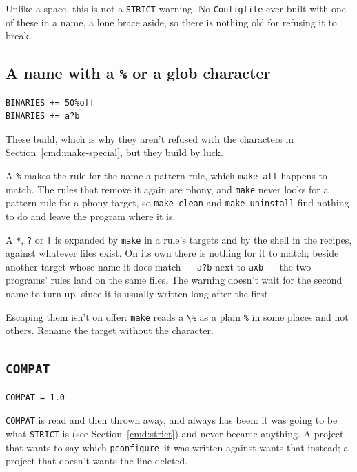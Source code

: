\documentclass{article}
\newcommand{\pconfigure}{\texttt{pconfigure}}
\begin{document}
Unlike a space, this is not a \texttt{STRICT} warning.  No
\texttt{Configfile} ever built with one of these in a name, a lone
brace aside, so there is nothing old for refusing it to break.

\subsection{A name with a \texttt{\%} or a glob character
  \label{warn:wildcard}}

\begin{verbatim}
BINARIES += 50%off
BINARIES += a?b
\end{verbatim}

These build, which is why they aren't refused with the characters in
Section~\ref{cmd:make-special}, but they build by luck.

A \texttt{\%} makes the rule for the name a pattern rule, which
\texttt{make all} happens to match.  The rules that remove it again
are phony, and \texttt{make} never looks for a pattern rule for a
phony target, so \texttt{make clean} and \texttt{make uninstall}
find nothing to do and leave the program where it is.

A \texttt{*}, \texttt{?} or \texttt{[} is expanded by \texttt{make}
in a rule's targets and by the shell in the recipes, against whatever
files exist.  On its own there is nothing for it to match; beside
another target whose name it does match --- \texttt{a?b} next to
\texttt{axb} --- the two programs' rules land on the same files.  The
warning doesn't wait for the second name to turn up, since it is
usually written long after the first.

Escaping them isn't on offer: \texttt{make} reads a
\texttt{\textbackslash\%} as a plain \texttt{\%} in some places and
not others.  Rename the target without the character.

\subsection{\texttt{COMPAT}}

\begin{verbatim}
COMPAT = 1.0
\end{verbatim}

\texttt{COMPAT} is read and then thrown away, and always has been: it
was going to be what \texttt{STRICT} is (see
Section~\ref{cmd:strict}) and never became anything.  A project that
wants to say which \pconfigure\ it was written against wants that
instead; a project that doesn't wants the line deleted.
\end{document}
